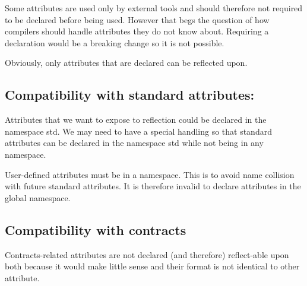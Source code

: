 \documentclass[a4paper,11pt]{article}
\begin{document}
Some attributes are used only by external tools and should therefore not
required to be declared before being used. However that begs the
question of how compilers should handle attributes they do not know
about. Requiring a declaration would be a breaking change so it is not
possible.

Obviously, only attributes that are declared can be reflected upon.

\subsection{Compatibility with standard
attributes:}\label{compatibility-with-standard-attributes}

Attributes that we want to expose to reflection could be declared in the
namespace std. We may need to have a special handling so that standard
attributes can be declared in the namespace std while not being in any
namespace.

User-defined attributes must be in a namespace. This is to avoid name
collision with future standard attributes. It is therefore invalid to
declare attributes in the global namespace.

\subsection{Compatibility with
contracts}\label{compatibility-with-contracts}

Contracts-related attributes are not declared (and therefore)
reflect-able upon both because it would make little sense and their
format is not identical to other attribute.
\end{document}
